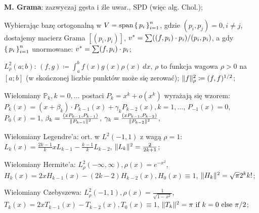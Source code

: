 \entry
\textbf{M. Grama}: zazwyczaj gęsta i źle uwar., SPD (więc alg. Chol.);

\entry
Wybierając bazę ortogonalną w $V = \text{span}\set{p_i}^n_{i=1}$,
gdzie $(p_i, p_j) = 0, i \neq j$, dostajemy macierz Grama
$[(p_i, p_i)]$,
$v^{*} = \sum((f,p_i)\cdot p_i)/(p_i, p_i)$,
a gdy $\set{p_i}^n_{i=1}$ unormowane:
$v^{*} = \sum(f,p_i)\cdot p_i$;

\entry
$L^2_\rho(a;b)$:
$(f,g) \coloneqq \int^b_a f(x)g(x)\rho(x) \ dx$,
$\rho$ to funkcja wagowa $\rho > 0$ na $[a;b]$
(w skończonej liczbie punktów może się zerować);
$\|f\|^2_\rho \coloneqq (f,f)^{1/2}$;

\entry
Wielomiany $\mathbb{P}_k, k=0,\ldots$ postaci
$P_k = x^k + o(x^k)$ wyrażają się wzorem:
$P_k(x) = (x + \beta_k) \cdot P_{k-1}(x) + \gamma_k P_{k-2}(x), k=1,\ldots$,
$P_{-1}(x)=0$,
$P_{0}(x)=1$,
$\beta_k= \frac{(x P_{k-1}, P_{k-1})}{\|P_{k-1}\|^2}$,
$\gamma_k = \frac{(x P_{k-1}, P_{k-2})}{\|P_{k-2}\|^2}$,

\entry
Wielomiany Legendre'a:
ort. w $L^2(-1,1)$ z wagą $\rho = 1$:
$L_k(x) = \frac{2k-1}{k}xL_{k-1} - \frac{k-1}{k}L_{k-2}$,
$\|L_k\|^2=\frac{2}{2k+1}$;

\entry
Wielomiany Hermite'a:
$L^2_\rho(-\infty, \infty), \rho(x)=e^{-x^2}$,
$H_k(x) = 2xH_{k-1}(x) - (2k-2) H_{k-2}(x), H_0(x) \equiv 1$,
$\|H_k\|^2 = \sqrt{\pi}2^kk!$;

\entry
Wielomiany Czebyszewa:
$L_\rho^2(-1,1), \rho(x)=\frac{1}{\sqrt{1-x^2}}$,
$T_k(x) = 2xT_{k-1}(x) - T_{k-2}(x), T_0(x)\equiv 1$,
$\|T_k\|^2 = \pi \text{ if } k=0 \text{ else } \pi/2$;
